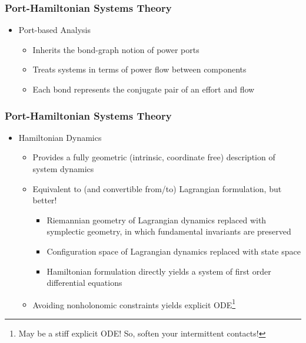 \documentclass[aspectratio=169,handout]{beamer}
\begin{document}
		\begin{frame}
			\frametitle{Port-Hamiltonian Systems Theory}
			\begin{itemize}
				\item Port-based Analysis
					\begin{itemize}
						\item Inherits the bond-graph notion of power ports
						\item Treats systems in terms of power flow between components
						\item Each bond represents the conjugate pair of an effort and flow
					\end{itemize}
			\end{itemize}
		\end{frame}
	
		\begin{frame}
			\frametitle{Port-Hamiltonian Systems Theory}
			\begin{itemize}
				\item Hamiltonian Dynamics
					\begin{itemize}
						\item Provides a fully geometric (intrinsic, coordinate free) description of system dynamics
						\item Equivalent to (and convertible from/to) Lagrangian formulation, but better!
							\begin{itemize} 
								\item Riemannian geometry of Lagrangian dynamics replaced with symplectic geometry, in which fundamental invariants are preserved
								\item Configuration space of Lagrangian dynamics replaced with state space
								\item Hamiltonian formulation directly yields a system of first order differential equations
							\end{itemize}
						\item Avoiding nonholonomic constraints yields explicit ODE\footnote{May be a stiff explicit ODE! So, soften your intermittent contacts!}
					\end{itemize}
			\end{itemize}
		\end{frame}
	
	
	
\end{document}
